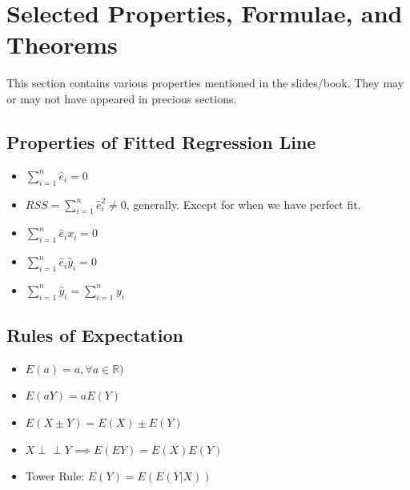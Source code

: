 \documentclass[10pt]{article}
\newcommand{\real}{\mathbb{R}}
\newcommand{\independent}{\perp \!\!\! \perp}
\begin{document}


\newpage
\section{Selected Properties, Formulae, and Theorems}
This section contains various properties mentioned in the slides/book. They may or may not have appeared in precious sections. 
\subsection{Properties of Fitted Regression Line}
\begin{itemize}
    \item $\sum_{i = 1}^n \hat{e}_i = 0$
    \item $RSS = \sum_{i = 1}^n \hat{e}_i^2 \neq 0$, generally. Except for when we have perfect fit.
    \item $\sum_{i= 1}^n \hat{e}_i x_i = 0$
    \item $\sum_{i= 1}^n \hat{e}_i \hat{y}_i = 0$
    \item $\sum_{i = 1}^n \hat{y}_i = \sum_{i= 1}^n y_i$
\end{itemize}

\subsection{Rules of Expectation}
\begin{itemize}
    \item $E(a) = a, \forall a \in \real)$
    \item $E(aY) = aE(Y)$
    \item $E(X \pm Y) = E(X) \pm E(Y)$
    \item $X\independent Y \implies E(EY) = E(X) E(Y)$
    \item Tower Rule: $E(Y) = E(E(Y|X))$
\end{itemize}
\end{document}

